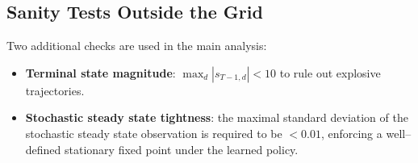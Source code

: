 \documentclass[12pt,english]{article}
\begin{document}
\subsection{Sanity Tests Outside the Grid}
Two additional checks are used in the main analysis:
\begin{itemize}
  \item \textbf{Terminal state magnitude}: $\max_d |s_{T-1,d}|<10$ to rule out explosive trajectories.
  \item \textbf{Stochastic steady state tightness}: the maximal standard deviation of the stochastic steady state observation is required to be $<0.01$, enforcing a well--defined stationary fixed point under the learned policy.
\end{itemize}
\end{document}
